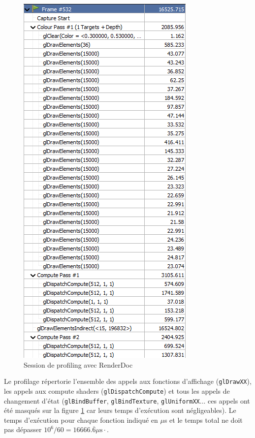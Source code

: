 \documentclass{EPUProjetDi}
\newcommand{\code}{\texttt}
\begin{document}
\begin{figure}
	\begin{center}
		\includegraphics[scale=.4]{profiling}
	\end{center}
	\caption{Session de profiling avec RenderDoc}
	\label{fig:profiling}
\end{figure}

Le profilage répertorie l'ensemble des appels aux fonctions d'affichage (\code{glDrawXX}), les appels aux compute shaders (\code{glDispatchCompute}) et tous les appels de changement d'état (\code{glBindBuffer}, \code{glBindTexture}, \code{glUniformXX}... ces appels ont été masqués sur la figure \ref{fig:profiling} car leurs temps d'exécution sont négligeables). Le temps d'exécution pour chaque fonction indiqué en $\mu$s et le temps total ne doit pas dépasser $10^6/60=16666.\overline{6}\mu\text{s}\cdot$.
\end{document}
